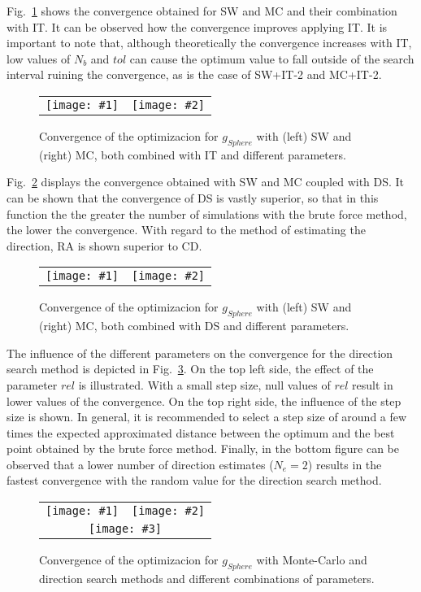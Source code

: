 \documentclass[review,authoryear]{elsarticle}
\newcommand{\PLOTII}[4]
{
	\begin{figure}[ht!]
		\centering
		\begin{tabular}{cc}
			\texttt{[image: \#1]} & \texttt{[image: \#2]}
		\end{tabular}
		\caption{#3.\label{#4}}
	\end{figure}
}
\newcommand{\FIGIII}[5]
{
	\begin{figure}[ht!]
		\centering
		\begin{tabular}{cc}
			\texttt{[image: \#1]} & \texttt{[image: \#2]} \\
			\multicolumn{2}{c}{\texttt{[image: \#3]}}
		\end{tabular}
		\caption{#4.\label{#5}}
	\end{figure}
}
\begin{document}
Fig.~\ref{FigSphereSWMC} shows the convergence obtained for SW and MC and their
combination with IT. It can
be observed how the convergence improves applying IT. It is important
to note that, although theoretically the convergence increases with IT, 
low values of $N_b$ and $tol$ can cause the optimum value to fall outside of the search
interval ruining the convergence, as is the case of SW+IT-2 and MC+IT-2.
\PLOTII{sphere-evolution-sw.eps}{sphere-evolution-mc.eps}
{Convergence of the optimizacion for $g_{Sphere}$ with (left) SW and (right) MC,
both combined with IT and different parameters}{FigSphereSWMC}

Fig.~\ref{FigSphereSWMCGR} displays the convergence obtained with SW and MC
coupled with DS. It can be shown that the convergence of DS is vastly superior,
so that in this function the the greater the number of simulations with 
the brute force method, the lower the convergence. With regard to the method of
estimating the direction, RA is shown superior to CD.
\PLOTII{sphere-evolution-sw-cdr.eps}{sphere-evolution-mc-cdr.eps}
{Convergence of the optimizacion for $g_{Sphere}$ with (left) SW and (right) MC,
both combined with DS and different parameters}{FigSphereSWMCGR}

The influence of the different parameters on the convergence for the direction
search method is depicted in Fig.~\ref{FigSphereMCCDR}.
On the top left side, the effect of the parameter $rel$ is illustrated. With a
small step size, null values of $rel$ result in lower values of the convergence.
On the top right side, the influence of the step size is shown. In general,
it is recommended to select a step size of around a few times the expected 
approximated distance between the optimum and the best point obtained by the brute
force method. Finally, in the bottom figure can be observed that a lower number of direction
estimates ($N_e=2$) results in the fastest convergence with the random value for the
direction search method. 
\FIGIII{sphere-evolution-mc-cd-r.eps}{sphere-evolution-mc-cd-s.eps}
{sphere-evolution-mc-r.eps}
{Convergence of the optimizacion for $g_{Sphere}$ with Monte-Carlo and direction
search methods and different combinations of parameters}{FigSphereMCCDR}
\end{document}
